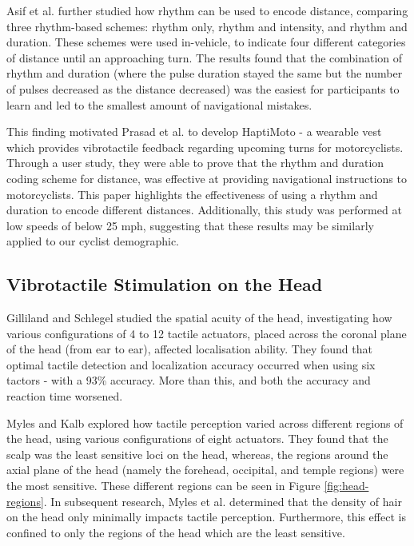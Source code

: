 \documentclass{mpaper}
\begin{document}
Asif et al. \cite{10.1145/1868914.1868923} further studied how rhythm can be used to encode distance, comparing three rhythm-based schemes: rhythm only, rhythm and intensity, and rhythm and duration. These schemes were used in-vehicle, to indicate four different categories of distance until an approaching turn. The results found that the combination of rhythm and duration (where the pulse duration stayed the same but the number of pulses decreased as the distance decreased) was the easiest for participants to learn and led to the smallest amount of navigational mistakes. 

This finding motivated Prasad et al. \cite{10.1145/2556288.2557404} to develop HaptiMoto - a wearable vest which provides vibrotactile feedback regarding upcoming turns for motorcyclists. Through a user study, they were able to prove that the rhythm and duration coding scheme for distance, was effective at providing navigational instructions to motorcyclists. This paper highlights the effectiveness of using a rhythm and duration to encode different distances. Additionally, this study was performed at low speeds of below 25 mph, suggesting that these results may be similarly applied to our cyclist demographic.



\subsection{Vibrotactile Stimulation on the Head}
Gilliland and Schlegel \cite{doi:10.1177/001872089403600410} studied the spatial acuity of the head, investigating how various configurations of 4 to 12 tactile actuators, placed across the coronal plane of the head (from ear to ear), affected localisation ability. They found that optimal tactile detection and localization accuracy occurred when using six tactors - with a 93\% accuracy. More than this, and both the accuracy and reaction time worsened. 

Myles and Kalb \cite{headguidelines} explored how tactile perception varied across different regions of the head, using various configurations of eight actuators. They found that the scalp was the least sensitive loci on the head, whereas, the regions around the axial plane of the head (namely the forehead, occipital, and temple regions) were the most sensitive. These different regions can be seen in Figure \ref{fig:head-regions}. In subsequent research, Myles et al. \cite{MYLES2015177} determined that the density of hair on the head only minimally impacts tactile perception. Furthermore, this effect is confined to only the regions of the head which are the least sensitive.
\end{document}
